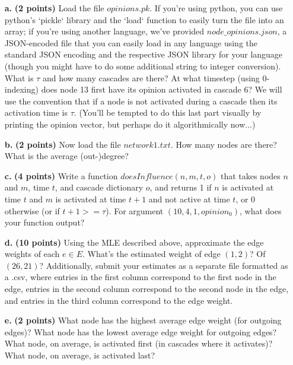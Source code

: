 \documentclass[11pt]{article}
\begin{document}
\begin{itemize}
\item[\textbf{a. }] \textbf{(2 points)} Load the file $opinions.pk$. If you're using python, you can use python's `pickle` library and the `load` function to easily turn the file into an array; if you're using another language, we've provided $node\_opinions.json$, a JSON-encoded file that you can easily load in any language using the standard JSON encoding and the respective JSON library for your language (though you might have to do some additional string to integer conversion). What is $\tau$ and how many cascades are there? At what timestep (using 0-indexing) does node 13 first have its opinion activated in cascade 6? We will use the convention that if a node is not activated during a cascade then its activation time is $\tau$. (You'll be tempted to do this last part visually by printing the opinion vector, but perhaps do it algorithmically now...)
\item[\textbf{b. }] \textbf{(2 points)} Now load the file $network1.txt$. How many nodes are there? What is the average (out-)degree?
\item[\textbf{c. }] \textbf{(4 points)} Write a function $doesInfluence(n,m,t,o)$ that takes nodes $n$ and $m$, time $t$, and cascade dictionary $o$, and returns 1 if $n$ is activated at time $t$ and $m$ is activated at time $t+1$ and not active at time $t$, or 0 otherwise (or if $t + 1 >= \tau$). For argument $(10,4,1,opinion_0)$, what does your function output?
\item[\textbf{d. }] \textbf{(10 points)} Using the MLE described above, approximate the edge weights of each $e \in E$. What's the estimated weight of edge $(1,2)$? Of $(26, 21)$? Additionally, submit your estimates as a separate file formatted as a .csv, where entries in the first column correspond to the first node in the edge, entries in the second column correspond to the second node in the edge, and entries in the third column correspond to the edge weight.
\item[\textbf{e. }] \textbf{(2 points)} What node has the highest average edge weight (for outgoing edges)? What node has the lowest average edge weight for outgoing edges? What node, on average, is activated first (in cascades where it activates)? What node, on average, is activated last?
\end{itemize}
\end{document}
